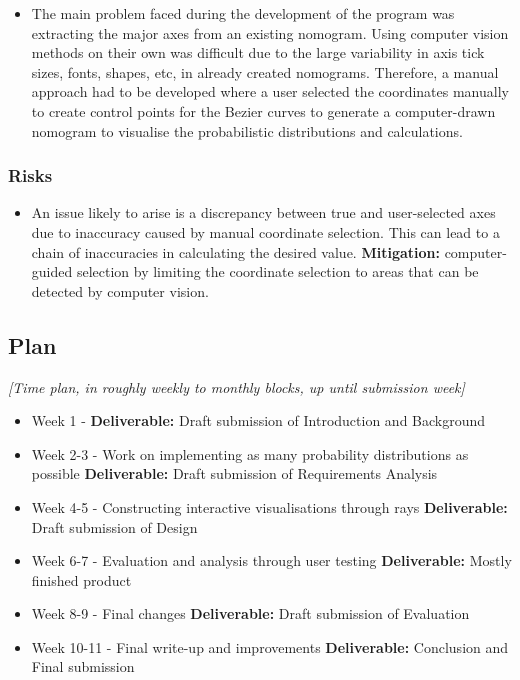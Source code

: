 \documentclass[11pt]{article}
\begin{document}
\begin{itemize}
    \item The main problem faced during the development of the program was extracting the major axes from an existing nomogram. Using computer vision methods on their own was difficult due to the large variability in axis tick sizes, fonts, shapes, etc, in already created nomograms. Therefore, a manual approach had to be developed where a user selected the coordinates manually to create control points for the Bezier curves to generate a computer-drawn nomogram to visualise the probabilistic distributions and calculations. 
    
    
\end{itemize}

\subsubsection{Risks}\label{risks}


\begin{itemize}
    \item An issue likely to arise is a discrepancy between true and user-selected axes due to inaccuracy caused by manual coordinate selection. This can lead to a chain of inaccuracies in calculating the desired value.  \textbf{Mitigation: }computer-guided selection by limiting the coordinate selection to areas that can be detected by computer vision.  
    
\end{itemize}

\subsection{Plan}\label{plan}

\emph{{[}Time plan, in roughly weekly to monthly blocks, up until
submission week{]}}

    
    \begin{itemize}
        \item Week 1 - \textbf{Deliverable:} Draft submission of Introduction and Background 
        \item Week 2-3 - Work on implementing as many probability distributions as possible 
        \textbf{Deliverable:} Draft submission of Requirements Analysis
        \item Week 4-5 - Constructing interactive visualisations through rays
        \textbf{Deliverable:} Draft submission of Design
        \item Week 6-7 - Evaluation and analysis through user testing 
        \textbf{Deliverable:} Mostly finished product
        \item Week 8-9 - Final changes 
        \textbf{Deliverable:} Draft submission of Evaluation
        \item Week 10-11 - Final write-up and improvements
        \textbf{Deliverable:} Conclusion and Final submission

        
    \end{itemize}
    
    
\end{document}
